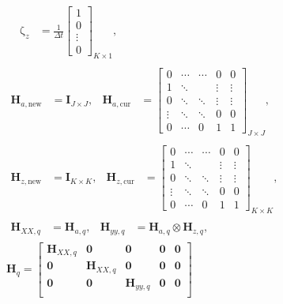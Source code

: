 \documentclass[USenglish]{article}
\renewcommand{\vec}[1]{\boldsymbol{\mathrm{#1}}}
\newcommand{\mat}[1]{\mathbf{#1}}
\begin{document}
\begin{subequations}
\begin{gather}
\begin{aligned}
      &
      \vec{\zeta}_z
      &=
      \frac{1}{\Delta t}
      \begin{bmatrix}
        1 \\ 0 \\ \vdots \\ 0
      \end{bmatrix}_{K \times 1},
    \end{aligned}
    \\
    \begin{aligned}
      \mat{H}_{a, \mathrm{new}} &= \mat{I}_{J \times J},
      &
      \mat{H}_{a, \mathrm{cur}} &=
      \begin{bmatrix}
        0 & \cdots & \cdots & 0 & 0 \\
        1 & \ddots & & \vdots & \vdots \\
        0 & \ddots & \ddots & \vdots & \vdots \\
        \vdots & \ddots & \ddots & 0 & 0 \\
        0 & \cdots & 0 & 1 & 1
      \end{bmatrix}_{J \times J},
    \end{aligned}
    \\
    \begin{aligned}
      \mat{H}_{z, \mathrm{new}} &= \mat{I}_{K \times K},
      &
      \mat{H}_{z, \mathrm{cur}}
      &=
      \begin{bmatrix}
        0 & \cdots & \cdots & 0 & 0 \\
        1 & \ddots & & \vdots & \vdots \\
        0 & \ddots & \ddots & \vdots & \vdots \\
        \vdots & \ddots & \ddots & 0 & 0 \\
        0 & \cdots & 0 & 1 & 1
      \end{bmatrix}_{K \times K},
    \end{aligned}
    \\
    \begin{aligned}
      \mat{H}_{XX, q} &= \mat{H}_{a, q},
      &
      \mat{H}_{yy, q} &= \mat{H}_{a, q} \otimes \mat{H}_{z, q},
    \end{aligned}
    \\
    \mat{H}_q =
    \begin{bmatrix}
      \mat{H}_{XX, q} & \mat{0} & \mat{0} & \mat{0} & \mat{0} \\
      \mat{0} & \mat{H}_{XX, q} & \mat{0} & \mat{0} & \mat{0} \\
      \mat{0} & \mat{0} & \mat{H}_{yy, q} & \mat{0} & \mat{0} \\

\end{bmatrix}
\end{gather}
\end{subequations}
\end{document}
